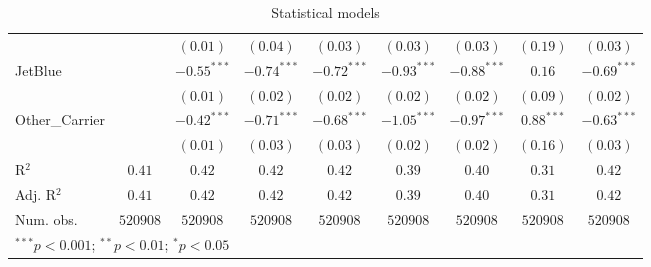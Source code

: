 \begin{table}
\begin{center}
\begin{tabular}{l c c c c c c c c}
                             &               & $(0.01)$      & $(0.04)$      & $(0.03)$      & $(0.03)$      & $(0.03)$      & $(0.19)$      & $(0.03)$      \\
JetBlue                      &               & $-0.55^{***}$ & $-0.74^{***}$ & $-0.72^{***}$ & $-0.93^{***}$ & $-0.88^{***}$ & $0.16$        & $-0.69^{***}$ \\
                             &               & $(0.01)$      & $(0.02)$      & $(0.02)$      & $(0.02)$      & $(0.02)$      & $(0.09)$      & $(0.02)$      \\
Other\_Carrier               &               & $-0.42^{***}$ & $-0.71^{***}$ & $-0.68^{***}$ & $-1.05^{***}$ & $-0.97^{***}$ & $0.88^{***}$  & $-0.63^{***}$ \\
                             &               & $(0.01)$      & $(0.03)$      & $(0.03)$      & $(0.02)$      & $(0.02)$      & $(0.16)$      & $(0.03)$      \\
\hline
R$^2$                        & $0.41$        & $0.42$        & $0.42$        & $0.42$        & $0.39$        & $0.40$        & $0.31$        & $0.42$        \\
Adj. R$^2$                   & $0.41$        & $0.42$        & $0.42$        & $0.42$        & $0.39$        & $0.40$        & $0.31$        & $0.42$        \\
Num. obs.                    & $520908$      & $520908$      & $520908$      & $520908$      & $520908$      & $520908$      & $520908$      & $520908$      \\
\hline
\multicolumn{9}{l}{\scriptsize{$^{***}p<0.001$; $^{**}p<0.01$; $^{*}p<0.05$}}
\end{tabular}
\caption{Statistical models}
\label{table:coefficients}
\end{center}
\end{table}
